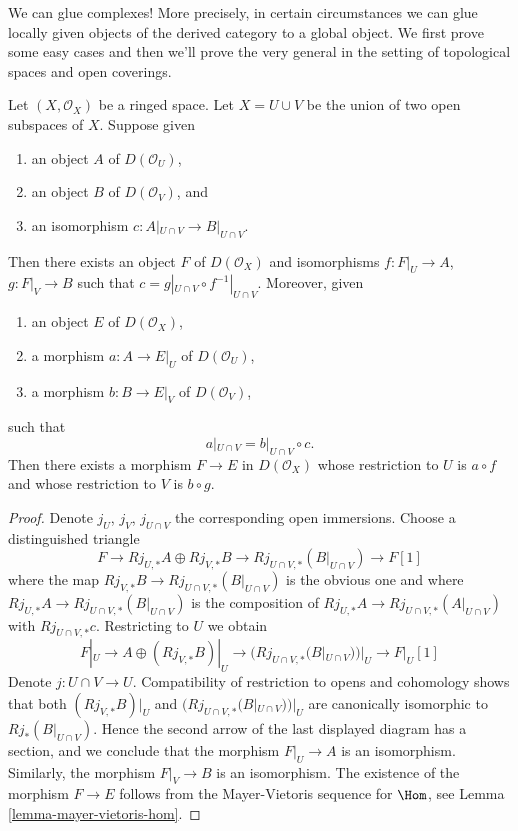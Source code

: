 \noindent
We can glue complexes! More precisely, in certain circumstances we can
glue locally given objects of the derived category to a global object.
We first prove some easy cases and then we'll prove the very general
\cite[Theorem 3.2.4]{BBD}
in the setting of topological spaces and open coverings.

\begin{lemma}
\label{lemma-glue}
Let $(X, \mathcal{O}_X)$ be a ringed space. Let $X = U \cup V$ be
the union of two open subspaces of $X$. Suppose given
\begin{enumerate}
\item an object $A$ of $D(\mathcal{O}_U)$,
\item an object $B$ of $D(\mathcal{O}_V)$, and
\item an isomorphism $c : A|_{U \cap V} \to B|_{U \cap V}$.
\end{enumerate}
Then there exists an object $F$ of $D(\mathcal{O}_X)$
and isomorphisms $f : F|_U \to A$, $g : F|_V \to B$ such
that $c = g|_{U \cap V} \circ f^{-1}|_{U \cap V}$.
Moreover, given
\begin{enumerate}
\item an object $E$ of $D(\mathcal{O}_X)$,
\item a morphism $a : A \to E|_U$ of $D(\mathcal{O}_U)$,
\item a morphism $b : B \to E|_V$ of $D(\mathcal{O}_V)$, 
\end{enumerate}
such that
$$
a|_{U \cap V}  = b|_{U \cap V} \circ c.
$$
Then there exists a morphism $F \to E$ in $D(\mathcal{O}_X)$
whose restriction to $U$ is $a \circ f$
and whose restriction to $V$ is $b \circ g$.
\end{lemma}

\begin{proof}
Denote $j_U$, $j_V$, $j_{U \cap V}$ the corresponding open immersions.
Choose a distinguished triangle
$$
F \to Rj_{U, *}A \oplus Rj_{V, *}B \to Rj_{U \cap V, *}(B|_{U \cap V})
\to F[1]
$$
where the map $Rj_{V, *}B \to Rj_{U \cap V, *}(B|_{U \cap V})$ is the
obvious one and where
$Rj_{U, *}A \to Rj_{U \cap V, *}(B|_{U \cap V})$
is the composition of
$Rj_{U, *}A \to Rj_{U \cap V, *}(A|_{U \cap V})$
with $Rj_{U \cap V, *}c$. Restricting to $U$ we obtain
$$
F|_U \to A \oplus (Rj_{V, *}B)|_U \to (Rj_{U \cap V, *}(B|_{U \cap V}))|_U
\to F|_U[1]
$$
Denote $j : U \cap V \to U$. Compatibility of restriction to opens and
cohomology shows that both
$(Rj_{V, *}B)|_U$ and $(Rj_{U \cap V, *}(B|_{U \cap V}))|_U$
are canonically isomorphic to $Rj_*(B|_{U \cap V})$.
Hence the second arrow of the last displayed diagram has
a section, and we conclude that the morphism $F|_U \to A$ is
an isomorphism. Similarly, the morphism $F|_V \to B$ is an
isomorphism. The existence of the morphism $F \to E$ follows
from the Mayer-Vietoris sequence for $\Hom$, see
Lemma \ref{lemma-mayer-vietoris-hom}.
\end{proof}

